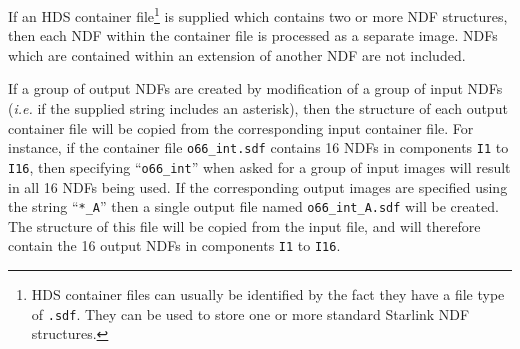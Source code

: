 \documentclass[twoside,11pt]{starlink}
\begin{document}
If an HDS container file\footnote{HDS container files can usually be
identified by the fact they have a file type of \texttt{.sdf}. They can be
used to store one or more standard Starlink NDF structures.} is supplied
which contains two or more NDF structures, then each NDF within the
container file is processed as a separate image. NDFs which are contained
within an extension of another NDF are not included.

If a group of output NDFs are created by modification of a group of
input NDFs (\emph{i.e.} if the supplied string includes an asterisk), then
the structure of each output container file will be
copied from the corresponding input container file. For instance, if
the container file \verb+o66_int.sdf+ contains 16 NDFs in components
\verb+I1+ to \verb+I16+, then specifying ``\verb+o66_int+'' when asked
for a group of input images will result in all 16 NDFs being used.
If the corresponding output images are specified using the string
``\verb+*_A+'' then a single output file named \verb+o66_int_A.sdf+ will be created.
The structure of this file will be copied from the input file, and will
therefore contain the 16 output NDFs in components \verb+I1+ to \verb+I16+.
\end{document}
